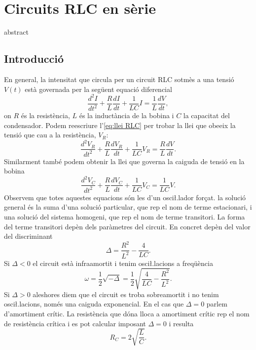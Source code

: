 \chapter{Circuits RLC en sèrie}

\begin{resum}
abstract
\end{resum}

\section{Introducció}
En general, la intensitat que circula per un circuit RLC sotmès a una tensió \( V(t) \) està governada per la següent equació diferencial
\begin{equation} \label{eq:llei RLC}
	\frac{d^2 I}{dt^2} + \frac{R}{L} \frac{dI}{dt} + \frac{1}{LC}I = \frac{1}{L}\frac{dV}{dt},
\end{equation}
on \( R \) és la resistència, \( L \) és la inductància de la bobina i \( C \) la capacitat del condensador. Podem reescriure l'\cref{eq:llei RLC} per trobar la llei que obeeix la tensió que cau a la resistència, \( V_R \):
\begin{equation} \label{eq:llei VR}
	\frac{d^2V_R}{dt^2} + \frac{R}{L}\frac{dV_R}{dt} + \frac{1}{LC}V_R = \frac{R}{L}\frac{dV}{dt}.
\end{equation}
Similarment també podem obtenir la llei que governa la caiguda de tensió en la bobina
\begin{equation} \label{eq:llei VC}
	\frac{d^2V_C}{dt^2} + \frac{R}{L}\frac{dV_C}{dt} + \frac{1}{LC}V_C = \frac{1}{LC}V.
\end{equation}
Observem que totes aquestes equacions són les d'un osci\l.lador forçat. la solució general és la suma d'una solució particular, que rep el nom de terme estacionari, i una solució del sistema homogeni, que rep el nom de terme transitori. La forma del terme transitori depèn dels paràmetres del circuit. En concret depèn del valor del discriminant
\begin{equation*}
	\Delta = \frac{R^2}{L^2} - \frac{4}{LC}.
\end{equation*}
Si \( \Delta < 0 \) el circuit està infraamortit i tenim osci\l.lacions a freqüència 
\begin{equation} \label{eq:freq amortida}
 	\omega = \frac{1}{2}\sqrt{-\Delta} = \frac{1}{2}\sqrt{\frac{4}{LC} - \frac{R^2}{L^2}}. 
\end{equation}
Si \( \Delta > 0 \) aleshores diem que el circuit es troba sobreamortit i no tenim osci\l.lacions, només una caiguda exponencial. En el cas que \( \Delta = 0 \) parlem d'amortiment crític. La resistència que dóna lloca a amortiment crític rep el nom de resistència crítica i es pot calcular imposant \( \Delta = 0 \) i resulta
\begin{equation} \label{eq:resistencia critica}
	R_C = 2\sqrt{\frac{L}{C}}. 
\end{equation}

